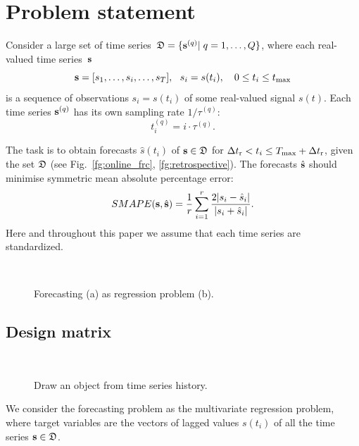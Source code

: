 \documentclass[conference]{IEEEtran}
\begin{document}
\section{Problem statement}
Consider a large set of time series~${\mathfrak{D}}=\{{\mathbf{s}}^{(q)}| \; q = 1,\dots, {Q}\}$, where each real-valued time series~${\mathbf{s}}$
\[ {\mathbf{s}} = [s_1, \dots, s_i, \dots, s_{T}], ~~ s_i = s(t_i),\quad 0 \leq t_i \leq t_{\max}\]
is a sequence of observations $s_i = s(t_i)$ of some real-valued signal $s(t)$.
Each time series ${\mathbf{s}}^{(q)}$ has its own sampling rate $1/\tau^{(q)}$:
\[t_i^{(q)} = {i}\cdot\tau^{(q)}.\]

 The task is to obtain forecasts $\hat{s}(t_i)$ of ${\mathbf{s}} \in {\mathfrak{D}}$ for  $\Delta t_\text{r} <  t_i \leq T_{\max} + \Delta t_\text{r}$, given the set  ${\mathfrak{D}}$ (see Fig.~\ref{fg:online_frc}, \ref{fg:retrospective}). The forecasts $\hat{{\mathbf{s}}}$ should minimise symmetric mean absolute percentage error:
 \begin{equation}\label{eq:MAPE}
 SMAPE(\bs, \hat{\bs}) = \frac{1}{r}\sum_{i = 1}^{r} \frac{2|s_i - \hat{s}_i|}{|s_i + \hat{s}_i|}. \end{equation}
 Here and throughout this paper we assume that each time series are standardized.


\begin{figure}[!ht]
\def\svgwidth{0.4\textwidth}
\centering
\subfloat[]{
\label{fg:online_frc}} \\
\def\svgwidth{0.4\textwidth}
\centering \subfloat[]
{
\label{fg:forecasting}
}
\caption{Forecasting (a) as regression problem (b).}
\end{figure}




\subsection{Design matrix}

\begin{figure}[!ht]
\def\svgwidth{0.4\textwidth}
\centering
\subfloat[]{\label{fg:draw}} \\
\def\svgwidth{0.4\textwidth}
\centering\subfloat[]{\label{fg:design}}
\caption{Draw an object from time series history.}
\end{figure}
 We consider the forecasting problem as the multivariate regression problem, where target variables are the vectors of lagged values $s(t_i)$ of all the time series ${\mathbf{s}} \in {\mathfrak{D}}$.
\end{document}
